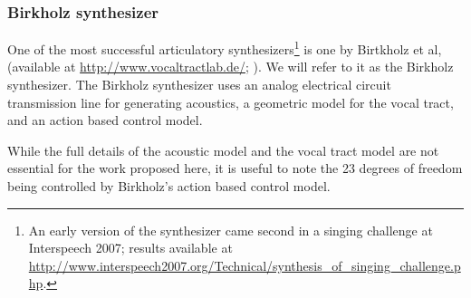 \documentclass{article}
\begin{document}
\subsubsection{Birkholz synthesizer}
\label{subsec:birkholz}

One of the most successful articulatory
synthesizers\footnote{An early version of the synthesizer
  came second in a singing challenge
  at Interspeech 2007; results available at
  \url{http://www.interspeech2007.org/Technical/synthesis_of_singing_challenge.php}.}
is one by Birtkholz et al,
(available at \url{http://www.vocaltractlab.de/};
\citealp{birkholz2013}).
We will refer to it as the Birkholz synthesizer.
The Birkholz synthesizer uses
an analog electrical circuit transmission line
for generating acoustics,
a geometric model for the vocal tract,
and an action based control model.

While the full details of the acoustic model
and the vocal tract model are not
essential for the work proposed here,
it is useful to note
the 23 degrees of freedom
being controlled by Birkholz's
action based control model.
\end{document}
